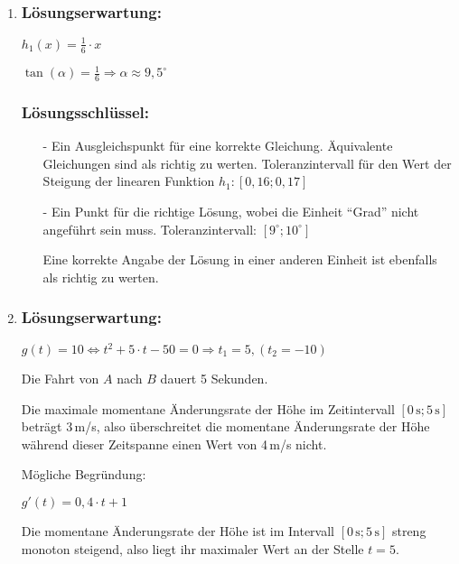 \begin{langesbeispiel}
{\begin{enumerate}
\begin{itemize}
\item[-] Ein Punkt für die richtige Entscheidung und eine korrekte Begründung. Andere korrekte
Begründungen sind ebenfalls als richtig zu werten.
\end{itemize}

\item \subsubsection{Lösungserwartung:}

$h_1(x)=\frac{1}{6}\cdot x$

$\tan(\alpha)=\frac{1}{6} \Rightarrow \alpha \approx 9,5^\circ$

\subsubsection{Lösungsschlüssel:}

\begin{itemize}
	\item[-] Ein Ausgleichspunkt für eine korrekte Gleichung. Äquivalente Gleichungen sind als richtig zu
werten.
Toleranzintervall für den Wert der Steigung der linearen Funktion $h_1: [0,16; 0,17]$
\item[-] Ein Punkt für die richtige Lösung, wobei die Einheit "`Grad"' nicht angeführt sein muss.
Toleranzintervall: $[9^\circ; 10^\circ]$

Eine korrekte Angabe der Lösung in einer anderen Einheit ist ebenfalls als richtig zu werten.
\end{itemize}

\item \subsubsection{Lösungserwartung:}

$g(t)=10 \Leftrightarrow t^2+5\cdot t-50=0 \Rightarrow t_1=5, (t_2=-10)$

Die Fahrt von $A$ nach $B$ dauert 5 Sekunden.\leer

Die maximale momentane Änderungsrate der Höhe im Zeitintervall $[0\,\text{s}; 5\,\text{s}]$ beträgt 3\,m/s,
also überschreitet die momentane Änderungsrate der Höhe während dieser Zeitspanne einen
Wert von 4\,m/s nicht.

Mögliche Begründung:

$g'(t)=0,4\cdot t +1$

Die momentane Änderungsrate der Höhe ist im Intervall $[0\,\text{s};5\,\text{s}]$ streng monoton steigend, also liegt ihr maximaler Wert an der Stelle $t=5$.


\end{enumerate}}
\end{langesbeispiel}
